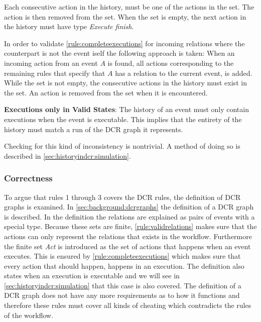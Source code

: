 	Each consecutive action in the history, must be one of the actions in the set. The action is then removed from the set. When the set is empty, the next action in the history must have type \textit{Execute finish}.
	
	\newpar In order to validate \autoref{rule:completeexecutions} for incoming relations where the counterpart is not the event iself the following approach is taken: When an incoming action from an event $A$ is found, all actions corresponding to the remaining rules that specify that $A$ has a relation to the current event, is added. While the set is not empty, the consecutive actions in the history must exist in the set. An action is removed from the set when it is encountered.

	\begin{ruledef}
		\textbf{Executions only in Valid States}: The history of an event must only contain executions when the event is executable. This implies that the entirety of the history must match a run of the DCR graph it represents.
		\label{rule:executionvalidstate}
	\end{ruledef}
	
	\noindent Checking for this kind of inconsistency is nontrivial. A method of doing so is described in \autoref{sec:historyindcr:simulation}.
	
	\subsubsection{Correctness}
	To argue that rules 1 through 3 covers the DCR rules, the definition of DCR graphs is examined. In \autoref{sec:background:dcrgraphs} the definition of a DCR graph is described. In the definition the relations are explained as pairs of events with a special type. Because these sets are finite, \autoref{rule:validrelations} makes sure that the actions can only represent the relations that exists in the workflow. Furthermore the finite set \textit{Act} is introduced as the set of actions that happens when an event executes. This is ensured by \autoref{rule:completeexecutions} which makes sure that every action that should happen, happens in an execution. The definition also states when an execution is executable and we will see in \autoref{sec:historyindcr:simulation} that this case is also covered. The definition of a DCR graph does not have any more requirements as to how it functions and therefore these rules must cover all kinds of cheating which contradicts the rules of the workflow.
	
